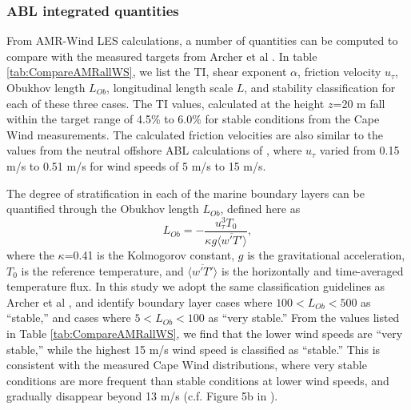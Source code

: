 \subsubsection{\label{sec:stableABLStats} ABL integrated quantities}

From AMR-Wind LES calculations, a number of quantities can be computed
to compare with the measured targets from Archer et al
\cite{archer2016predominance}.  In
table \ref{tab:CompareAMRallWS}, we list the TI, shear exponent
$\alpha$, friction velocity $u_\tau$, Obukhov length $L_{Ob}$,
longitudinal length scale $L$, and stability classification for each of
these three cases.  The TI values, calculated at the height $z$=20 m
fall within the target range of 4.5\% to 6.0\% for stable conditions
from the Cape Wind measurements.  The calculated friction velocities
are also similar to the values from the neutral offshore ABL
calculations of \cite{cheung2020large}, where $u_\tau$ varied from
0.15 m/s to 0.51 m/s for wind speeds of 5 m/s to 15 m/s.

The degree of stratification in each of the marine boundary layers can
be quantified through the Obukhov length $L_{Ob}$, defined here as
\begin{equation}
  L_{Ob} = -\frac{u_\tau^3 T_0}{\kappa g \langle \overline{w'T'} \rangle},
\end{equation}
where the $\kappa$=0.41 is the Kolmogorov constant, $g$ is the
gravitational acceleration, $T_0$ is the reference temperature, and
$\langle \overline{w'T'} \rangle$ is the horizontally and
time-averaged temperature flux.  In this study we adopt the same
classification guidelines as Archer et al
\cite{archer2016predominance}, and identify boundary layer cases where
$100 < L_{Ob} < 500$ as ``stable,'' and cases where $5 < L_{Ob}<100$
as ``very stable.''  From the values listed in Table
\ref{tab:CompareAMRallWS}, we find that the lower wind speeds are
``very stable,'' while the highest 15 m/s wind speed is classified as
``stable.''  This is consistent with the measured Cape Wind
distributions, where very stable conditions are more frequent than
stable conditions at lower wind speeds, and gradually disappear beyond
13 m/s (c.f. Figure 5b in \cite{archer2016predominance}).

